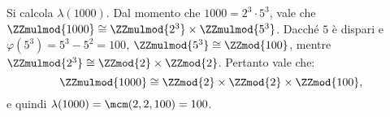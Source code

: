 \documentclass[12pt]{scrartcl}
\begin{document}
	\begin{example}[$\lambda(1000)$]
		Si calcola $\lambda(1000)$. Dal momento che $1000 = 2^3 \cdot 5^3$, vale
		che $\ZZmulmod{1000} \cong \ZZmulmod{2^3} \times \ZZmulmod{5^3}$.
		Dacché $5$ è dispari e $\varphi(5^3) = 5^3 - 5^2 = 100$, $\ZZmulmod{5^3} \cong \ZZmod{100}$, mentre
		$\ZZmulmod{2^3} \cong \ZZmod{2} \times \ZZmod{2}$. Pertanto vale che:
		\[ \ZZmulmod{1000} \cong \ZZmod{2} \times \ZZmod{2} \times \ZZmod{100}, \]
		e quindi $\lambda(1000) = \mcm(2,2,100) = 100$.
	\end{example}
\end{document}
